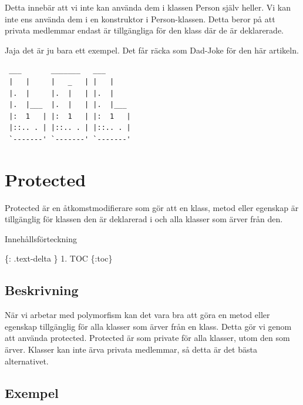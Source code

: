 Detta innebär att vi inte kan använda dem i klassen Person själv heller.
Vi kan inte ens använda dem i en konstruktor i Person-klassen. Detta
beror på att privata medlemmar endast är tillgängliga för den klass där
de är deklarerade.

Jaja det är ju bara ett exempel. Det får räcka som Dad-Joke för den här
artikeln.

\begin{verbatim}
 ___       _______   ___
 |   |     |   _   | |   |
 |.  |     |.  |   | |.  |
 |.  |___  |.  |   | |.  |___
 |:  1   | |:  1   | |:  1   |
 |::.. . | |::.. . | |::.. . |
 `-------' `-------' `-------'
\end{verbatim}

\hypertarget{protected}{%
\section{Protected}\label{protected}}

Protected är en åtkomstmodifierare som gör att en klass, metod eller
egenskap är tillgänglig för klassen den är deklarerad i och alla klasser
som ärver från den.

Innehållsförteckning

\{: .text-delta \} 1. TOC \{:toc\}

\hypertarget{beskrivning}{%
\subsection{Beskrivning}\label{beskrivning}}

När vi arbetar med polymorfism kan det vara bra att göra en metod eller
egenskap tillgänglig för alla klasser som ärver från en klass. Detta gör
vi genom att använda protected. Protected är som private för alla
klasser, utom den som ärver. Klasser kan inte ärva privata medlemmar, så
detta är det bästa alternativet.

\hypertarget{exempel}{%
\subsection{Exempel}\label{exempel}}

